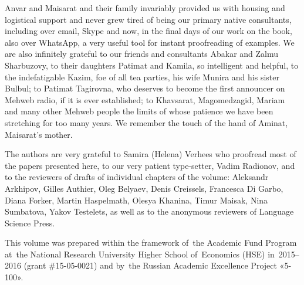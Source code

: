 \begin{refsection}
Anvar and Maisarat and their family invariably provided us with housing
and logistical support and never grew tired of being our primary native
consultants, including over email, Skype and now, in the final days of
our work on the book, also over WhatsApp, a very useful tool for instant
proofreading of examples. We are also infinitely grateful to our friends
and consultants Abakar and Zalmu Sharbuzovy, to their daughters Patimat
and Kamila, so intelligent and helpful, to the indefatigable Kazim, foe
of all tea parties, his wife Munira and his sister Bulbul; to Patimat
Tagirovna, who deserves to become the first announcer on Mehweb radio, if it
is ever established; to Khavsarat, Magomedzagid, Mariam and many
other Mehweb people the limits of whose patience we have been stretching for
too many years. We remember the touch of the hand of Aminat, Maisarat's
mother.

The authors are very grateful to Samira (Helena) Verhees who proofread
most of the papers presented here, to our very patient type-setter, Vadim Radionov, and to the reviewers of drafts of individual chapters of the volume: Aleksandr Arkhipov, Gilles Authier, Oleg Belyaev, Denis
Creissels, Francesca Di Garbo, Diana Forker, Martin Haspelmath, Olesya
Khanina, Timur Maisak, Nina Sumbatova, Yakov Testelets, as well as to
the anonymous reviewers of Language Science Press.

This volume was prepared within the framework of~the Academic Fund
Program at~the National Research University Higher School of~Economics
(HSE) in~2015–2016 (grant \#15-05-0021) and by~the Russian Academic
Excellence Project «5-100».

{}


\printbibliography[heading=subbibliography]

\end{refsection}

\clearpage

